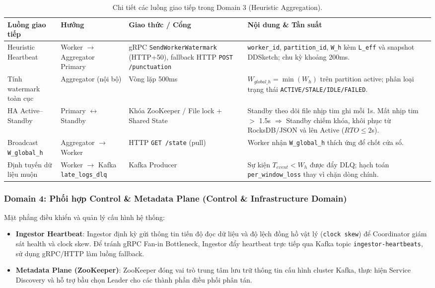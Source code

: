 \documentclass[12pt,a4paper]{article}
\begin{document}
\begin{table}[H]
    \centering
    \small
    \setlength{\tabcolsep}{4pt}
    \begin{tabular}{p{} p{} p{} p{}}
        \toprule
        \textbf{Luồng giao tiếp} & \textbf{Hướng} & \textbf{Giao thức / Cổng} & \textbf{Nội dung \& Tần suất} \\
        \midrule
        Heuristic Heartbeat & Worker $\to$ Aggregator Primary & gRPC \texttt{SendWorkerWatermark} (HTTP+50), fallback HTTP \texttt{POST /punctuation} & \texttt{worker\_id}, \texttt{partition\_id}, \texttt{W\_h} kèm \texttt{L\_eff} và snapshot DDSketch; chu kỳ khoảng 200ms. \\
        Tính watermark toàn cục & Aggregator (nội bộ) & Vòng lặp 500ms & $W_{global\_h} = \min(W_h)$ trên partition active; phân loại trạng thái \texttt{ACTIVE/STALE/IDLE/FAILED}. \\
        HA Active--Standby & Primary $\leftrightarrow$ Standby & Khóa ZooKeeper / File lock + Shared State & Standby theo dõi file nhịp tim ghi mỗi 1s. Mất nhịp tim $>$ 1.5s $\Rightarrow$ Standby chiếm khóa, khôi phục từ RocksDB/JSON và lên Active ($RTO\le 2$s). \\
        Broadcast \texttt{W\_global\_h} & Aggregator $\to$ Worker & HTTP \texttt{GET /state} (pull) & Worker nhận \texttt{W\_global\_h} thích ứng để chốt cửa sổ. \\
        Định tuyến dữ liệu muộn & Worker $\to$ Kafka \texttt{late\_logs\_dlq} & Kafka Producer & Sự kiện $T_{event} < W_h$ được đẩy DLQ; hạch toán \texttt{per\_window\_loss} thay vì chặn dòng chính. \\
        \bottomrule
    \end{tabular}
    \caption{Chi tiết các luồng giao tiếp trong Domain 3 (Heuristic Aggregation).}
\end{table}

\subsubsection{Domain 4: Phối hợp Control \& Metadata Plane (Control \& Infrastructure Domain)}
Mặt phẳng điều khiển và quản lý cấu hình hệ thống:
\begin{itemize}[leftmargin=*]
    \item \textbf{Ingestor Heartbeat}: Ingestor định kỳ gửi thông tin tiến độ đọc dữ liệu và độ lệch đồng hồ vật lý (\texttt{clock skew}) để Coordinator giám sát health và clock skew. Để tránh gRPC Fan-in Bottleneck, Ingestor đẩy heartbeat trực tiếp qua Kafka topic \texttt{ingestor-heartbeats}, sử dụng gRPC/HTTP làm luồng fallback.
    \item \textbf{Metadata Plane (ZooKeeper)}: ZooKeeper đóng vai trò trung tâm lưu trữ thông tin cấu hình cluster Kafka, thực hiện Service Discovery và hỗ trợ bầu chọn Leader cho các thành phần điều phối phân tán.
\end{itemize}
\end{document}
